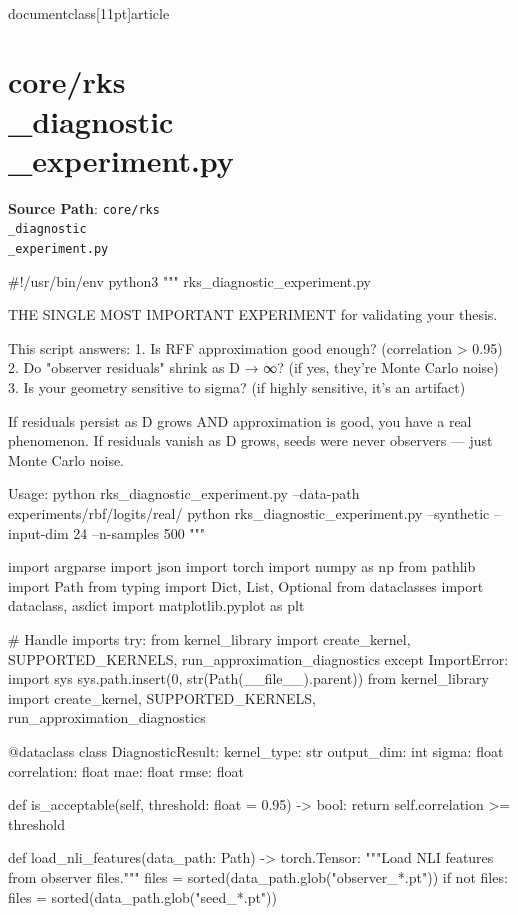 \\documentclass[11pt]{article}
\begin{document}
\section*{core/rks\\_diagnostic\\_experiment.py}
\textbf{Source Path}: \texttt{core/rks\\_diagnostic\\_experiment.py}\par
\bigskip
\begin{CodeBlock}
#!/usr/bin/env python3
"""
rks_diagnostic_experiment.py

THE SINGLE MOST IMPORTANT EXPERIMENT for validating your thesis.

This script answers:
1. Is RFF approximation good enough? (correlation > 0.95)
2. Do "observer residuals" shrink as D → ∞? (if yes, they're Monte Carlo noise)
3. Is your geometry sensitive to sigma? (if highly sensitive, it's an artifact)

If residuals persist as D grows AND approximation is good, you have a real phenomenon.
If residuals vanish as D grows, seeds were never observers — just Monte Carlo noise.

Usage:
    python rks_diagnostic_experiment.py --data-path experiments/rbf/logits/real/
    python rks_diagnostic_experiment.py --synthetic --input-dim 24 --n-samples 500
"""

import argparse
import json
import torch
import numpy as np
from pathlib import Path
from typing import Dict, List, Optional
from dataclasses import dataclass, asdict
import matplotlib.pyplot as plt

# Handle imports
try:
    from kernel_library import create_kernel, SUPPORTED_KERNELS, run_approximation_diagnostics
except ImportError:
    import sys
    sys.path.insert(0, str(Path(__file__).parent))
    from kernel_library import create_kernel, SUPPORTED_KERNELS, run_approximation_diagnostics


@dataclass
class DiagnosticResult:
    kernel_type: str
    output_dim: int
    sigma: float
    correlation: float
    mae: float
    rmse: float
    
    def is_acceptable(self, threshold: float = 0.95) -> bool:
        return self.correlation >= threshold


def load_nli_features(data_path: Path) -> torch.Tensor:
    """Load NLI features from observer files."""
    files = sorted(data_path.glob("observer_*.pt"))
    if not files:
        files = sorted(data_path.glob("seed_*.pt"))
    

\end{CodeBlock}
\end{document}
